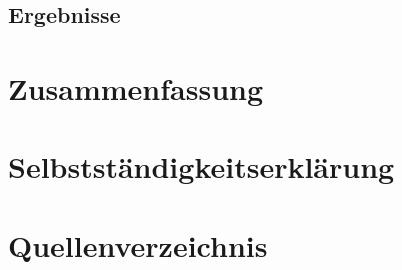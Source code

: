 \documentclass[a4paper, 12pt]{article}
\begin{document}
\subsection{Ergebnisse}
\label{sec:Ergebnisse}

\newpage
\section{Zusammenfassung}
\label{sec:Zusammenfassung}

\newpage
\section{Selbstständigkeitserklärung}

\newpage
\section{Quellenverzeichnis}
\printbibliography[keyword={buch},title={Literatur}]
\printbibliography[keyword={internet},title={Onlinequellen}]
\end{document}
